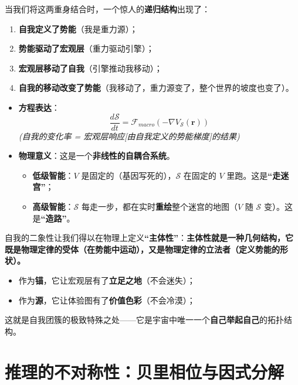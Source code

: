 
当我们将这两重身结合时，一个惊人的\textbf{递归结构}出现了：
\begin{enumerate}
        \item \textbf{自我定义了势能}（我是重力源）；
        \item \textbf{势能驱动了宏观层}（重力驱动引擎）；
        \item \textbf{宏观层移动了自我}（引擎推动我移动）；
        \item \textbf{自我的移动改变了势能}（我移动了，重力源变了，整个世界的坡度也变了）。
\end{enumerate}

\begin{itemize}
        \item \textbf{方程表达}：
                $$ \frac{d\mathcal{S}}{dt} = \mathcal{F}_{macro} \left( -\nabla V_{\mathcal{S}}(\mathbf{r}) \right) $$
                \textit{(自我的变化率 = 宏观层响应[由自我定义的势能梯度]的结果)}
        \item   \textbf{物理意义}：这是一个\textbf{非线性的自耦合系统}。
        \begin{itemize}
                \item   \textbf{低级智能}：$V$ 是固定的（基因写死的），$\mathcal{S}$ 在固定的 $V$ 里跑。这是\textbf{“走迷宫”}；
                \item   \textbf{高级智能}：$\mathcal{S}$ 每走一步，都在实时\textbf{重绘}整个迷宫的地图（$V$ 随 $\mathcal{S}$ 变）。这是\textbf{“造路”}。
        \end{itemize}
\end{itemize}


自我的二象性让我们得以在物理上定义\textbf{“主体性”}：\textbf{主体性就是一种几何结构，它既是物理定律的受体（在势能中运动），又是物理定律的立法者（定义势能的形状）。}
\begin{itemize}
        \item   作为\textbf{锚}，它让宏观层有了\textbf{立足之地}（不会迷失）；
        \item   作为\textbf{源}，它让体验图有了\textbf{价值色彩}（不会冷漠）；
\end{itemize}
这就是自我团簇的极致特殊之处——它是宇宙中唯一一个\textbf{自己举起自己}的拓扑结构。


\section{推理的不对称性：贝里相位与因式分解}
\label{sec:section_677}


